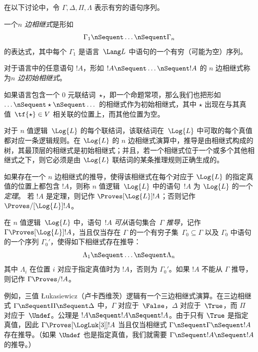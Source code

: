 \documentclass[../../../include/open-logic-section]{subfiles}
\begin{document}


在以下讨论中，令 $\Gamma, \Delta, \Pi, \Lambda$ 表示有穷的语句序列。

\begin{defn}[相继式]
一个\emph{$n$ 边相继式}是形如
\[
\Gamma_1 \nSequent \dots \nSequent \Gamma_n
\]
的表达式，其中每个 $\Gamma_1$ 是语言~$\Lang L$ 中语句的一个有穷（可能为空）序列。
\end{defn}

\begin{defn}[初始相继式]
对于语言中的任意语句 $!A$，形如 $!A \nSequent \dots \nSequent !A$ 的 $n$ 边相继式称为\emph{$n$ 边初始相继式}。

如果语言包含一个 0 元联结词~$\star$，即一个命题常项，那么我们也把形如 $\dots \nSequent \star \nSequent \dots$ 的相继式作为初始相继式，其中 $\star$ 出现在与其真值~$\tf{\star} \in V$ 相关联的位置上，而其他位置为空。
\end{defn}

对于 $n$ 值逻辑~$\Log{L}$ 的每个联结词，该联结词在~$\Log{L}$ 中可取的每个真值都对应一条逻辑规则。在 $\Log{L}$ 的 $n$ 边相继式演算中，推导是由相继式构成的树，其最顶层的相继式是初始相继式；并且，若一个相继式位于一个或多个其他相继式之下，则它必须是由 $\Log{L}$ 联结词的某条推理规则正确生成的。

\begin{defn}[定理]
如果存在一个 $n$ 边相继式的推导，使得该相继式在每个对应于 $\Log{L}$ 的指定真值的位置上都包含 $!A$，则称 $n$ 值逻辑~$\Log{L}$ 中的语句~$!A$ 为 $\Log{L}$ 的一个\emph{定理}。
若 $!A$ 是定理，则记作 $\Proves[\Log{L}] !A$；否则记作 $\Proves/[\Log{L}] !A$。
\end{defn}

\begin{defn}[可推导性]
在 $n$ 值逻辑~$\Log{L}$ 中，语句~$!A$ \emph{可从}语句集合~$\Gamma$ \emph{推导}，记作 $\Gamma \Proves[\Log{L}] !A$，当且仅当存在 $\Gamma$ 的一个有穷子集~$\Gamma_0 \subseteq \Gamma$ 以及 $\Gamma_0$ 中语句的一个序列 $\Gamma_0'$，使得如下相继式存在推导：
\[ \Lambda_1 \nSequent \dots \nSequent \Lambda_n \]
其中 $\Lambda_i$ 在位置 $i$ 对应于指定真值时为 $!A$，否则为 $\Gamma_0'$。如果 $!A$ 不能从 $\Gamma$ 推导，则记作 $\Gamma \Proves/ !A$。
\end{defn}

例如，三值 Łukasiewicz（卢卡西维茨）逻辑有一个三边相继式演算。在三边相继式 $\Gamma \nSequent \Pi \nSequent \Delta$ 中，$\Gamma$ 对应于~$\False$，$\Delta$ 对应于~$\True$，而 $\Pi$ 对应于~$\Undef$。公理是 $!A \nSequent !A \nSequent !A$。由于只有 $\True$ 是指定真值，因此 $\Gamma \Proves[\LogLuk[3]] !A$ 当且仅当相继式 $\Gamma \nSequent \Gamma \nSequent !A$ 存在推导。（如果 $\Undef$ 也是指定真值，我们就需要 $\Gamma \nSequent !A \nSequent !A$ 的推导。）
\end{document}
